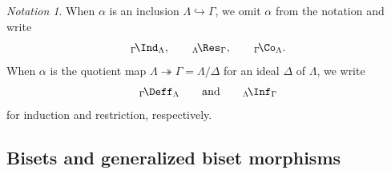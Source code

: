 \documentclass{amsart}
\numberwithin{equation}{section}%
\theoremstyle{remark}
\newtheorem{Not}[equation]{Notation}
\theoremstyle{definition}
\newcommand{\iInd}[2]{{}_{#1}\!\Ind_{#2}}
\newcommand{\iRes}[2]{{}_{#1}\!\Res_{#2}}
\newcommand{\iInf}[2]{{}_{#1}\!\Inf_{#2}}
\newcommand{\iCo}[2]{{}_{#1}\!\Co_{#2}}
\newcommand{\iDef}[2]{{}_{#1}\!\Deff_{#2}}
\begin{document}
%
\begin{Not}
\label{Not:change-of-rings}
When $\alpha$ is an inclusion
$\Lambda\hookrightarrow\Gamma$, we omit $\alpha$ from the notation
and write
%
\[
\iInd{\Gamma}{\Lambda},
\qquad
\iRes{\Lambda}{\Gamma},
\qquad
\iCo{\Gamma}{\Lambda}.
\]
%
When $\alpha$ is the quotient map
$\Lambda\twoheadrightarrow\Gamma=\Lambda/\Delta$
for an ideal $\Delta$ of $\Lambda$, we write
%
\[
\iDef{\Gamma}{\Lambda}
\qquad\text{and}\qquad
\iInf{\Lambda}{\Gamma}
\]
%
for induction and restriction, respectively.
\end{Not}
%



%
\subsection{Bisets and generalized biset morphisms}\
\label{ssec:bisets-generalized-bisets}
%
\end{document}
